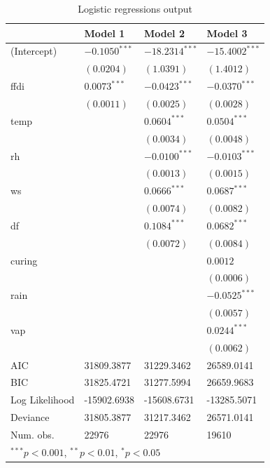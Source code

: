 \documentclass[11pt,a4paper]{article}
\begin{document}
\begin{table}
  \begin{center}
    \begin{tabular}{llll}
      \toprule
      & Model 1 & Model 2 & Model 3 \\
      \midrule
      (Intercept)    & $-0.1050^{***}$ & $-18.2314^{***}$ & $-15.4002^{***}$ \\
      & $(0.0204)$      & $(1.0391)$       & $(1.4012)$       \\
      ffdi           & $0.0073^{***}$  & $-0.0423^{***}$  & $-0.0370^{***}$  \\
      & $(0.0011)$      & $(0.0025)$       & $(0.0028)$       \\
      temp           &                 & $0.0604^{***}$   & $0.0504^{***}$   \\
      &                 & $(0.0034)$       & $(0.0048)$       \\
      rh             &                 & $-0.0100^{***}$  & $-0.0103^{***}$  \\
      &                 & $(0.0013)$       & $(0.0015)$       \\
      ws             &                 & $0.0666^{***}$   & $0.0687^{***}$   \\
      &                 & $(0.0074)$       & $(0.0082)$       \\
      df             &                 & $0.1084^{***}$   & $0.0682^{***}$   \\
      &                 & $(0.0072)$       & $(0.0084)$       \\
      curing         &                 &                  & $0.0012$         \\
      &                 &                  & $(0.0006)$       \\
      rain           &                 &                  & $-0.0525^{***}$  \\
      &                 &                  & $(0.0057)$       \\
      vap            &                 &                  & $0.0244^{***}$   \\
      &                 &                  & $(0.0062)$       \\
      \midrule
      AIC            & 31809.3877      & 31229.3462       & 26589.0141       \\
      BIC            & 31825.4721      & 31277.5994       & 26659.9683       \\
      Log Likelihood & -15902.6938     & -15608.6731      & -13285.5071      \\
      Deviance       & 31805.3877      & 31217.3462       & 26571.0141       \\
      Num. obs.      & 22976           & 22976            & 19610            \\
      \bottomrule
      \multicolumn{4}{l}{\scriptsize{$^{***}p<0.001$, $^{**}p<0.01$, $^*p<0.05$}}
    \end{tabular}
    \caption{Logistic regressions output}
    \label{table:coefficients}
  \end{center}
\end{table}
\end{document}
